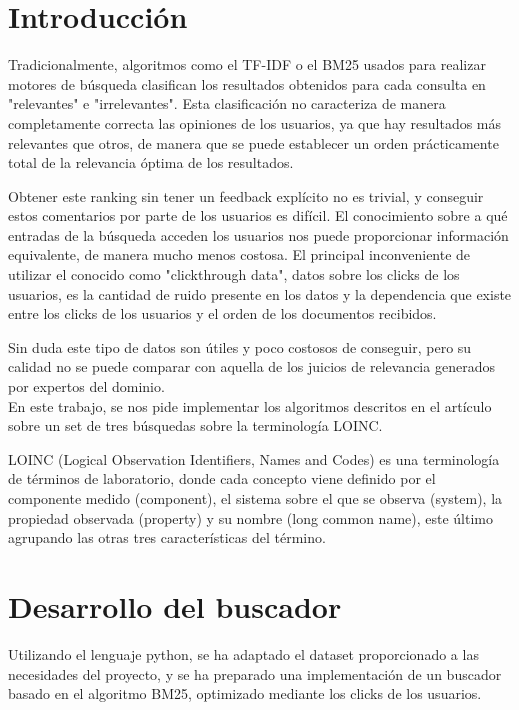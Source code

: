 \documentclass[a4paper,12pt]{article}
\begin{document}
	
	\setlength{\parindent}{0.5cm}
	\setlength{\voffset}{-2cm}
	\setlength{\hoffset}{-2cm}
	
	
	

	
	\section{Introducción}
	Tradicionalmente, algoritmos como el TF-IDF o el BM25 usados para realizar motores de búsqueda clasifican los resultados obtenidos para cada consulta en "relevantes" e "irrelevantes". Esta clasificación no caracteriza de manera completamente correcta las opiniones de los usuarios, ya que hay resultados más relevantes que otros, de manera que se puede establecer un orden prácticamente total de la relevancia óptima de los resultados.
	
	Obtener este ranking sin tener un feedback explícito no es trivial, y conseguir estos comentarios por parte de los usuarios es difícil. El conocimiento sobre a qué entradas de la búsqueda acceden los usuarios nos puede proporcionar información equivalente, de manera mucho menos costosa. El principal inconveniente de utilizar el conocido como "clickthrough data", datos sobre los clicks de los usuarios, es la cantidad de ruido presente en los datos y la dependencia que existe entre los clicks de los usuarios y el orden de los documentos recibidos.
	
	Sin duda este tipo de datos son útiles y poco costosos de conseguir, pero su calidad no se puede comparar con aquella de los juicios de relevancia generados por expertos del dominio.\\
	
	En este trabajo, se nos pide implementar los algoritmos descritos en el artículo \cite{articulo-clase} sobre un set de tres búsquedas sobre la terminología LOINC.
	
	LOINC (Logical Observation Identifiers, Names and Codes)\cite{loinc} es una terminología de términos de laboratorio, donde cada concepto viene definido por el componente medido (component), el sistema sobre el que se observa (system), la propiedad observada (property) y su nombre (long common name), este último agrupando las otras tres características del término.
	
	\section{Desarrollo del buscador}
	Utilizando el lenguaje python, se ha adaptado el dataset proporcionado a las necesidades del proyecto, y se ha preparado una implementación de un buscador basado en el algoritmo BM25, optimizado mediante los clicks de los usuarios.
	
\end{document}
